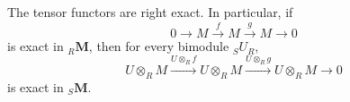 The tensor functors are right exact. In particular, if
$$0 \to M \xrightarrow{f} M \xrightarrow{g} M \to 0$$
is exact in ${}_R\mathbf{M}$, then for every bimodule ${}_S U_R$,
$$U \otimes_R M \xrightarrow{U \otimes_R f} U \otimes_R M \xrightarrow{U \otimes_R g} U \otimes_R M \to 0$$
is exact in ${}_S\mathbf{M}$.
